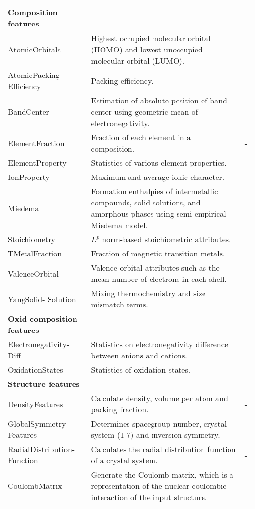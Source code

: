 \begin{center}
\begin{longtable}{M{3.0cm} M{6.0cm} M{2.5cm}}
  \hline
  \hline
  \textbf{Composition features} & & \\
  \hline
  AtomicOrbitals & Highest occupied molecular orbital (HOMO) and lowest unoccupied molecular orbital (LUMO). & \cite{Kotochigova1997}  \\ \hline
  AtomicPacking- Efficiency & Packing efficiency. & \cite{Laws2015}  \\ \hline
  BandCenter & Estimation of absolute position of band center using geometric mean of electronegativity. & \cite{Butler1978} \\ \hline
  ElementFraction & Fraction of each element in a composition. & -  \\
  ElementProperty & Statistics of various element properties. & \cite{Ong2013,Ward2016, Deml2016}  \\
  IonProperty & Maximum and average ionic character. & \cite{Ward2016} \\
  Miedema & Formation enthalpies of intermetallic compounds, solid solutions, and amorphous phases using semi-empirical Miedema model. & \cite{Weeber1987} \\
  Stoichiometry & $L^p$ norm-based stoichiometric attributes. & \cite{Ward2016} \\
  TMetalFraction & Fraction of magnetic transition metals. & \cite{Deml2016}  \\
  ValenceOrbital & Valence orbital attributes such as the mean number of electrons in each shell. & \cite{Ward2016}  \\
  YangSolid- Solution & Mixing thermochemistry and size mismatch terms. & \cite{Yang2012} \\
  \hline
  \textbf{Oxid composition features} &  &  \\
  \hline
  Electronegativity- Diff & Statistics on electronegativity difference between anions and cations. & \cite{Deml2016} \\
  OxidationStates & Statistics of oxidation states. & \cite{Deml2016}  \\
  \hline
  \textbf{Structure features} & & \\
  \hline
  DensityFeatures & Calculate density, volume per atom and packing fraction. & - \\
  GlobalSymmetry- Features & Determines spacegroup number, crystal system (1-7) and inversion symmetry. & - \\
  RadialDistribution- Function & Calculates the radial distribution function of a crystal system. & - \\
  CoulombMatrix & Generate the Coulomb matrix, which is a representation of the nuclear coulombic interaction of the input structure. & \cite{Rupp2012}  \\

\end{longtable}
\end{center}
